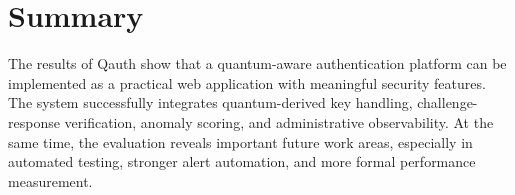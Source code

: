 \section{Summary}
The results of Qauth show that a quantum-aware authentication platform can be implemented as a practical web application with meaningful security features. The system successfully integrates quantum-derived key handling, challenge-response verification, anomaly scoring, and administrative observability. At the same time, the evaluation reveals important future work areas, especially in automated testing, stronger alert automation, and more formal performance measurement.
